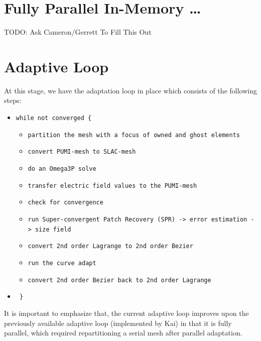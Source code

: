 \documentclass[review,authoryear,12pt]{elsarticle_summary_report}
\begin{document}
\section{Fully Parallel In-Memory \dots}
TODO: Ask Cameron/Gerrett To Fill This Out

\section{Adaptive Loop}
At this stage, we have the adaptation loop in place which consists of the following steps:

\begin{itemize}
  \item[] \texttt{while not converged \{ }
   \begin{itemize}
     \item \texttt{partition the mesh with a focus of owned and ghost elements}
     \item \texttt{convert PUMI-mesh to SLAC-mesh}
     \item \texttt{do an Omega3P solve} %
     \item \texttt{transfer electric field values to the PUMI-mesh}
     \item \texttt{check for convergence}
     \item \texttt{run Super-convergent Patch Recovery (SPR) -> error estimation -> size field}
     \item \texttt{convert 2nd order Lagrange to 2nd order Bezier}
     \item \texttt{run the curve adapt}
     \item \texttt{convert 2nd order Bezier back to 2nd order Lagrange}
   \end{itemize}

 \item[] \texttt{  \} }
\end{itemize}
It is important to emphasize that, the current adaptive loop improves upon the previously available adaptive loop (implemented by Kai) in that it is fully parallel, which required repartitioning a serial mesh after parallel adaptation.
\end{document}
